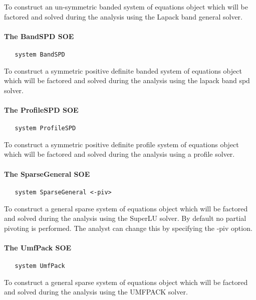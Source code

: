 \documentclass[12pt]{article}
\begin{document}
\noindent To construct an un-symmetric banded system of equations
object which will be factored and solved during the analysis using the
Lapack band general solver.

\paragraph{The BandSPD SOE}

{\sf\small
\begin{verbatim}
   system BandSPD
\end{verbatim}
}

\noindent To construct a symmetric positive definite banded system of equations
object which will be factored and solved during the analysis using the
lapack band spd solver.

\paragraph{The ProfileSPD SOE}

{\sf\small
\begin{verbatim}
   system ProfileSPD
\end{verbatim}
}

\noindent To construct a symmetric positive definite profile system of equations
object which will be factored and solved during the analysis using a
profile solver.

\paragraph{The SparseGeneral SOE}

{\sf\small
\begin{verbatim}
   system SparseGeneral <-piv>
\end{verbatim}
}

\noindent To construct a general sparse system of equations
object which will be factored and solved during the analysis using the
SuperLU solver. By default no partial pivoting is performed. The
analyst can change this by specifying the -piv option.

\paragraph{The UmfPack SOE}

{\sf\small
\begin{verbatim}
   system UmfPack 
\end{verbatim}
}

\noindent To construct a general sparse system of equations
object which will be factored and solved during the analysis using the
UMFPACK solver. \\
\end{document}
